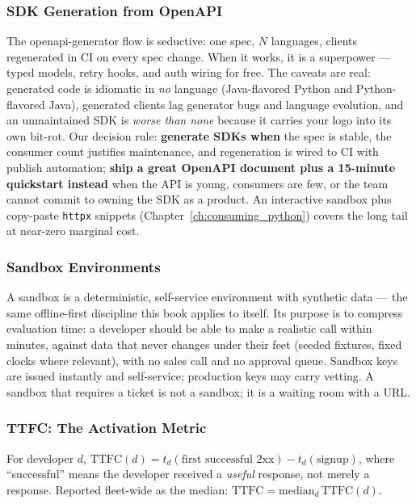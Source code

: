 \subsubsection{SDK Generation from OpenAPI}
The openapi-generator flow is seductive: one spec, $N$ languages, clients
regenerated in CI on every spec change. When it works, it is a superpower
--- typed models, retry hooks, and auth wiring for free. The caveats are
real: generated code is idiomatic in \emph{no} language (Java-flavored
Python and Python-flavored Java), generated clients lag generator bugs and
language evolution, and an unmaintained SDK is \emph{worse than none}
because it carries your logo into its own bit-rot. Our decision rule:
\textbf{generate SDKs when} the spec is stable, the consumer count justifies
maintenance, and regeneration is wired to CI with publish automation;
\textbf{ship a great OpenAPI document plus a 15-minute quickstart instead}
when the API is young, consumers are few, or the team cannot commit to
owning the SDK as a product. An interactive sandbox plus copy-paste
\texttt{httpx} snippets (Chapter~\ref{ch:consuming_python}) covers the
long tail at near-zero marginal cost.

\subsubsection{Sandbox Environments}
A sandbox is a deterministic, self-service environment with synthetic data
--- the same offline-first discipline this book applies to itself. Its
purpose is to compress evaluation time: a developer should be able to make
a realistic call within minutes, against data that never changes under
their feet (seeded fixtures, fixed clocks where relevant), with no sales
call and no approval queue. Sandbox keys are issued instantly and
self-service; production keys may carry vetting. A sandbox that requires a
ticket is not a sandbox; it is a waiting room with a URL.

\subsubsection{TTFC: The Activation Metric}
\begin{definition}
For developer $d$, $\mathrm{TTFC}(d) = t_d(\text{first successful 2xx}) -
t_d(\text{signup})$, where ``successful'' means the developer received a
\emph{useful} response, not merely a response. Reported fleet-wide as the
median: $\mathrm{TTFC} = \mathrm{median}_d\,\mathrm{TTFC}(d)$.
\end{definition}

